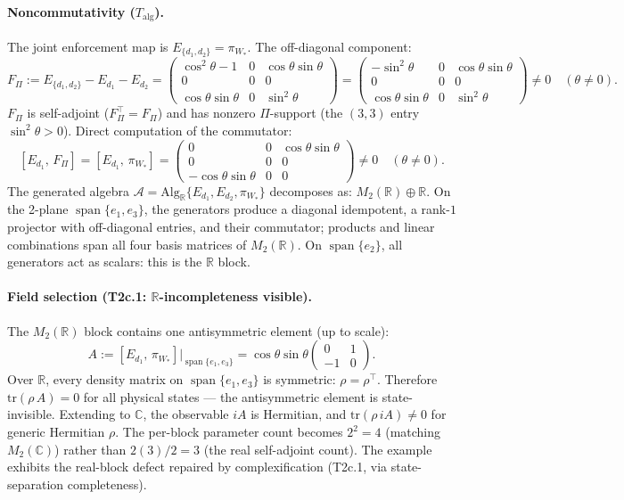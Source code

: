 \documentclass[11pt,a4paper]{article}
\theoremstyle{definition}
\newcommand{\tr}{\mathrm{tr}}
\DeclareMathOperator{\spn}{span}
\begin{document}
\paragraph{Noncommutativity ($T_{\mathrm{alg}}$).}
The joint enforcement map is $E_{\{d_1,d_2\}} = \pi_{W_*}$.  The off-diagonal component:
\[
F_\Pi := E_{\{d_1,d_2\}} - E_{d_1} - E_{d_2} = \begin{pmatrix} \cos^2\!\theta - 1 & 0 & \cos\theta\sin\theta \\ 0 & 0 & 0 \\ \cos\theta\sin\theta & 0 & \sin^2\!\theta \end{pmatrix} = \begin{pmatrix} -\sin^2\!\theta & 0 & \cos\theta\sin\theta \\ 0 & 0 & 0 \\ \cos\theta\sin\theta & 0 & \sin^2\!\theta \end{pmatrix} \ne 0 \quad (\theta \ne 0).
\]
$F_\Pi$ is self-adjoint ($F_\Pi^\top = F_\Pi$) and has nonzero $\Pi$-support (the $(3,3)$ entry $\sin^2\!\theta > 0$).  Direct computation of the commutator:
\[
[E_{d_1},\, F_\Pi] = [E_{d_1},\, \pi_{W_*}] = \begin{pmatrix} 0 & 0 & \cos\theta\sin\theta \\ 0 & 0 & 0 \\ -\cos\theta\sin\theta & 0 & 0 \end{pmatrix} \ne 0 \quad (\theta \ne 0).
\]
The generated algebra $\mathcal{A} = \mathrm{Alg}_\mathbb{R}\{E_{d_1}, E_{d_2}, \pi_{W_*}\}$ decomposes as: $M_2(\mathbb{R}) \oplus \mathbb{R}$.  On the 2-plane $\spn\{e_1, e_3\}$, the generators produce a diagonal idempotent, a rank-$1$ projector with off-diagonal entries, and their commutator; products and linear combinations span all four basis matrices of $M_2(\mathbb{R})$.  On $\spn\{e_2\}$, all generators act as scalars: this is the $\mathbb{R}$ block.

\paragraph{Field selection (T2c.1: $\mathbb{R}$-incompleteness visible).}
The $M_2(\mathbb{R})$ block contains one antisymmetric element (up to scale):
\[
A := [E_{d_1},\, \pi_{W_*}]|_{\spn\{e_1,e_3\}} = \cos\theta\sin\theta \begin{pmatrix} 0 & 1 \\ -1 & 0 \end{pmatrix}.
\]
Over $\mathbb{R}$, every density matrix on $\spn\{e_1, e_3\}$ is symmetric: $\rho = \rho^\top$.  Therefore $\tr(\rho\, A) = 0$ for all physical states --- the antisymmetric element is state-invisible.  Extending to $\mathbb{C}$, the observable $iA$ is Hermitian, and $\tr(\rho\, iA) \ne 0$ for generic Hermitian $\rho$.  The per-block parameter count becomes $2^2 = 4$ (matching $M_2(\mathbb{C})$) rather than $2(3)/2 = 3$ (the real self-adjoint count).  The example exhibits the real-block defect repaired by complexification (T2c.1, via state-separation completeness).
\end{document}
